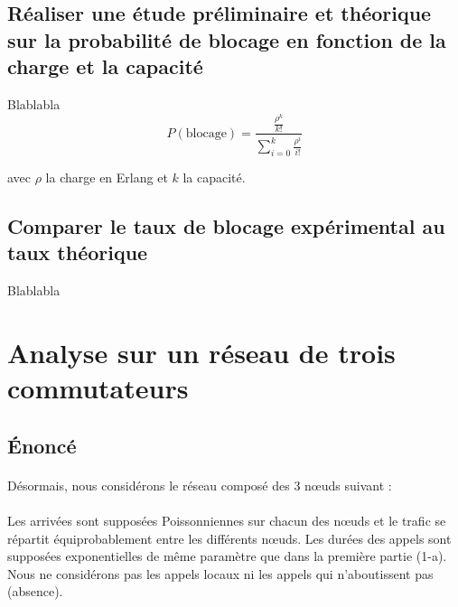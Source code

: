         \subsection{Réaliser une étude préliminaire et théorique sur la probabilité de blocage en fonction de la charge et la capacité}
Blablabla
\[ P(\text{blocage}) = \frac{ \frac{ \rho^k }{ k! } }{ \sum\limits_{i=0}^k \frac{ \rho^i }{ i! } } \]
\begin{center}
    avec $\rho$ la charge en Erlang et $k$ la capacité.
\end{center}
%
        \subsection{Comparer le taux de blocage expérimental au taux théorique}
Blablabla
%
    \clearpage
%
%
%
    \section{Analyse sur un réseau de trois commutateurs}
%
        \subsection{Énoncé}
%
            \paragraph{}
Désormais, nous considérons le réseau composé des 3 nœuds suivant :
%
            \paragraph{}
Les arrivées sont supposées Poissonniennes sur chacun des nœuds et le trafic se répartit équiprobablement entre les différents nœuds.
Les durées des appels sont supposées exponentielles de même paramètre que dans la première partie (1-a).
Nous ne considérons pas les appels locaux ni les appels qui n'aboutissent pas (absence).
%
